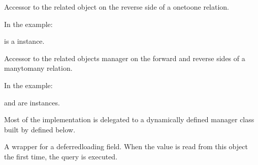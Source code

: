\documentclass[letterpaper,10pt,spanish]{sphinxmanual}
\begin{document}
\begin{fulllineitems}
\begin{fulllineitems}
\pysigstartsignatures
{}
\pysigstopsignatures
\sphinxAtStartPar
Accessor to the related object on the reverse side of a one\sphinxhyphen{}to\sphinxhyphen{}one
relation.

\sphinxAtStartPar
In the example:

\begin{sphinxVerbatim}[commandchars=\\\{\}]
 
       
\end{sphinxVerbatim}

\sphinxAtStartPar
{} is a  instance.

\end{fulllineitems}



\begin{fulllineitems}

\pysigstartsignatures
{}
\pysigstopsignatures
\sphinxAtStartPar
Accessor to the related objects manager on the forward and reverse sides of
a many\sphinxhyphen{}to\sphinxhyphen{}many relation.

\sphinxAtStartPar
In the example:

\begin{sphinxVerbatim}[commandchars=\\\{\}]
 
       
\end{sphinxVerbatim}

\sphinxAtStartPar
{} and  are 
instances.

\sphinxAtStartPar
Most of the implementation is delegated to a dynamically defined manager
class built by  defined below.

\end{fulllineitems}



\begin{fulllineitems}

\pysigstartsignatures
{}
\pysigstopsignatures
\sphinxAtStartPar
A wrapper for a deferred\sphinxhyphen{}loading field. When the value is read from this
object the first time, the query is executed.

\end{fulllineitems}


\end{fulllineitems}
\end{document}
